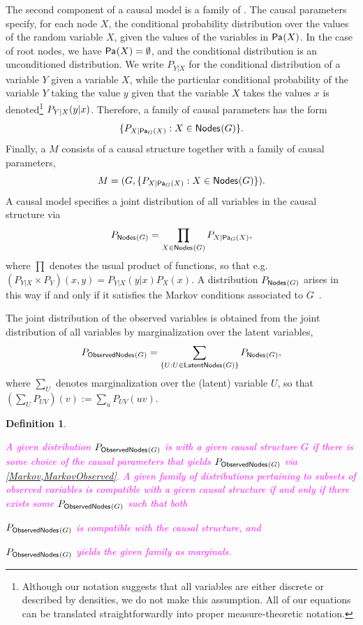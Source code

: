 \documentclass[aps,english,10pt,superscriptaddress,onecolumn,twoside,longbibliography,pra,floatfix,fleqn,nofootinbib]{revtex4-1}
\newcommand*{\tblue}[1]{{\color{medblue}{\textbf{#1}}}}
\newtheorem{definition}[theorem]{Definition}
\theoremstyle{definition}
\newcommand{\p}[2][]{{P_{#1}}\parenths{#2}}
\newcommand{\pfunc}[1]{P_{#1}}
\newcommand{\Pa}[2][]{{\mathsf{Pa}_{#1}}\parenths{#2}}
\newcommand{\SmallNamedFunction}[3][]{\operatorname{\mathsf{#2}}_{#1}\parenths{#3}}
\newcommand{\nodes}[1]{\SmallNamedFunction{Nodes}{#1}}
\newcommand{\obsnodes}[1]{\SmallNamedFunction{ObservedNodes}{#1}}
\newcommand{\latnodes}[1]{\SmallNamedFunction{LatentNodes}{#1}}
\DeclarePairedDelimiter{\parenths}{\lparen}{\rparen}
\newcommand{\elie}[1]{\textcolor{Fuchsia}{#1}}
\begin{document}
The second component of a causal model is a family of \tblue{causal parameters}.
The causal parameters specify, for each node $X$, the conditional probability distribution over the values of the random variable $X$, given the values of the variables in $\Pa{X}$.  In the case of root nodes, we have $\Pa{X} = \emptyset$, and the conditional distribution is an unconditioned distribution.
We write $\pfunc{Y|X}$ for the conditional distribution of a variable $Y$ given a variable $X$, while the particular conditional probability of the variable $Y$ taking the value $y$ given that the variable $X$ takes the values $x$ is denoted\footnote{Although our notation suggests that all variables are either discrete or described by densities, we do not make this assumption.  All of our equations can be translated straightforwardly into proper measure-theoretic notation.} $\p[Y|X]{y|x}$.    Therefore, a family of causal parameters has the form
\begin{align}
 \{ \pfunc{X|\Pa[G]{X}} : X \in \nodes{G} \}.
\end{align}
Finally, a \tblue{causal model} $M$ consists of a causal structure together with a family of causal parameters,
\[
	M = ( G,   \{ \pfunc{X|\Pa[G]{X}} : X \in \nodes{G} \}).
\]
A causal model specifies a joint distribution of all variables in the causal structure via
\begin{align}\label{Markov}
P_{\nodes{G}} = \prod_{X\in \nodes{G}} \pfunc{X|\Pa[G]{X}},
\end{align}
where $\prod$ denotes the usual product of functions, so that e.g.~$(P_{Y|X} \times P_Y)(x,y) = P_{Y|X}(y|x) P_X(x)$. A distribution $P_{\nodes{G}}$ arises in this way if and only if it satisfies the Markov conditions associated to $G$~\cite[Sec.~1.2]{pearl2009causality}.

The joint distribution of the observed variables is obtained from the joint distribution of all variables by marginalization over the latent variables,
\begin{align}\label{MarkovObserved}
P_{\obsnodes{G}} =  \sum_{\{U :U \in\latnodes{G}\}} P_{\nodes{G}},
\end{align}
where $\sum_U$ denotes marginalization over the (latent) variable $U$, so that $(\sum_U P_{UV})(v):= \sum_u P_{UV}(uv)$.

\begin{definition}\elie{
A given distribution $P_{\obsnodes{G}}$ is \tblue{compatible} with a given causal structure $G$ if there is some choice of the causal parameters that yields $P_{\obsnodes{G}}$ via \cref{Markov,MarkovObserved}. 
A given \emph{family} of distributions pertaining to \emph{subsets} of observed variables is compatible with a given causal structure if and only if there exists some $P_{\obsnodes{G}}$  such that both \begin{compactenum}
\item $P_{\obsnodes{G}}$ is compatible with the causal structure, and 
\item $P_{\obsnodes{G}}$  yields the given family as marginals.
\end{compactenum}}
\end{definition}
\end{document}
